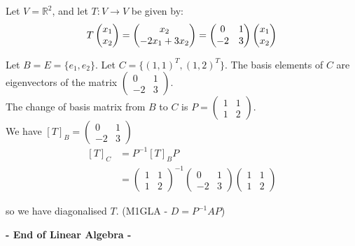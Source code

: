 \documentclass[twoside]{scrartcl}
\begin{document}
\begin{example} Let $V = \mathbb{R}^2$, and let $T: V \to V$ be given by:
\[
T\Spvek{x_1;x_2} = 
\Spvek[c]{x_2; -2x_1 + 3x_2}
= 
\begin{pmatrix}
0 & 1 \\ -2 & 3
\end{pmatrix}
\Spvek{x_1;x_2}
\]

Let $B = E = \{e_1,e_2\}$. Let $C = \{(1,1)^T,(1,2)^T\}$. The basis elements of $C$ are eigenvectors of the matrix $\begin{pmatrix}
0 & 1 \\ -2 & 3
\end{pmatrix}$. \\

The change of basis matrix from $B$ to $C$ is $P = \begin{pmatrix}
 1 & 1\\ 1 & 2
 \end{pmatrix}$.\\
 
 We have $[T]_B = \begin{pmatrix}
 0 & 1 \\ -2 & 3
 \end{pmatrix}$\\
 
 \[
 \begin{aligned}
 [T]_C &= P^{-1}[T]_BP\\
 &= \begin{pmatrix}
 1 & 1 \\ 1 & 2
 \end{pmatrix}^{-1}
 \begin{pmatrix}
 0 & 1 \\ -2 & 3
 \end{pmatrix}
\begin{pmatrix}
 1 & 1\\ 1 & 2
 \end{pmatrix}
 \end{aligned}\]
 
 so we have diagonalised $T$. (M1GLA - $D = P^{-1}AP$)
 \end{example}
 
 
\begin{center}
  
  \textsf{\textbf{- End of Linear Algebra -}}	
  \end{center}





\end{document}
